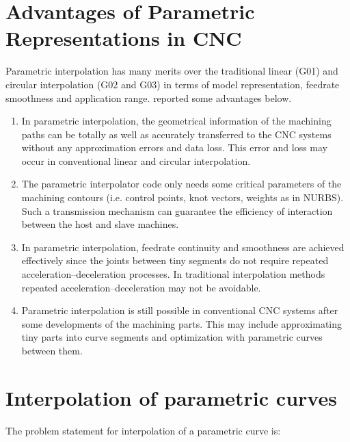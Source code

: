 \clearpage
\pagebreak
\section{Advantages of Parametric Representations in CNC}

Parametric interpolation has many merits over the traditional linear (G01) and circular interpolation (G02 and G03) in terms of model representation, feedrate smoothness and application range. \cite{Jin-etal:2014} reported some advantages below.\\

\begin{enumerate}
	\item In parametric interpolation, the geometrical information of the machining paths can be totally as well as accurately transferred to the CNC systems without any approximation errors and data loss. This error and loss may occur in conventional linear and circular interpolation.
	
	\item The parametric interpolator code only needs some critical parameters of the machining contours (i.e. control points, knot vectors, weights as in NURBS). Such a transmission mechanism can guarantee the efficiency of interaction between the host and slave machines.
	
	\item In parametric interpolation, feedrate continuity and smoothness are achieved effectively since the joints between tiny segments do not require repeated acceleration–deceleration processes. In traditional interpolation methods repeated acceleration–deceleration may not be avoidable.
	
	\item Parametric interpolation is still possible in conventional CNC systems after some developments of the machining parts. This may include approximating tiny parts into curve segments and optimization with parametric curves between them.
\end{enumerate}

\clearpage
\pagebreak

\section{Interpolation of parametric curves}

The problem statement for interpolation of a parametric curve is: \\

